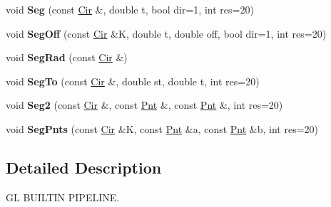 \begin{DoxyCompactItemize}
\item 
\hypertarget{namespacevsr_1_1_g_l_1_1_glyph_acb99cc6521fcb15255ce48960366b83c}{void {\bfseries Seg} (const \hyperlink{namespacevsr_a2744605aa828e495fc85463b7ae0d045}{Cir} \&, double t, bool dir=1, int res=20)}\label{namespacevsr_1_1_g_l_1_1_glyph_acb99cc6521fcb15255ce48960366b83c}

\item 
\hypertarget{namespacevsr_1_1_g_l_1_1_glyph_a65e6d07928718a67c6457af3cc1c11c5}{void {\bfseries Seg\-Off} (const \hyperlink{namespacevsr_a2744605aa828e495fc85463b7ae0d045}{Cir} \&K, double t, double off, bool dir=1, int res=20)}\label{namespacevsr_1_1_g_l_1_1_glyph_a65e6d07928718a67c6457af3cc1c11c5}

\item 
\hypertarget{namespacevsr_1_1_g_l_1_1_glyph_a78e83c5f8434a503c6eef2fd3fae5078}{void {\bfseries Seg\-Rad} (const \hyperlink{namespacevsr_a2744605aa828e495fc85463b7ae0d045}{Cir} \&)}\label{namespacevsr_1_1_g_l_1_1_glyph_a78e83c5f8434a503c6eef2fd3fae5078}

\item 
\hypertarget{namespacevsr_1_1_g_l_1_1_glyph_a0889d158ceb32861928d7a199e6713e4}{void {\bfseries Seg\-To} (const \hyperlink{namespacevsr_a2744605aa828e495fc85463b7ae0d045}{Cir} \&, double st, double t, int res=20)}\label{namespacevsr_1_1_g_l_1_1_glyph_a0889d158ceb32861928d7a199e6713e4}

\item 
\hypertarget{namespacevsr_1_1_g_l_1_1_glyph_ad6c129eb7dc399e7d3dd73c5c0fd1d83}{void {\bfseries Seg2} (const \hyperlink{namespacevsr_a2744605aa828e495fc85463b7ae0d045}{Cir} \&, const \hyperlink{namespacevsr_a2d05beb9721c5d9211b479af6d47222d}{Pnt} \&, const \hyperlink{namespacevsr_a2d05beb9721c5d9211b479af6d47222d}{Pnt} \&, int res=20)}\label{namespacevsr_1_1_g_l_1_1_glyph_ad6c129eb7dc399e7d3dd73c5c0fd1d83}

\item 
\hypertarget{namespacevsr_1_1_g_l_1_1_glyph_a6ef72395de1b945299d3b7972918b43f}{void {\bfseries Seg\-Pnts} (const \hyperlink{namespacevsr_a2744605aa828e495fc85463b7ae0d045}{Cir} \&K, const \hyperlink{namespacevsr_a2d05beb9721c5d9211b479af6d47222d}{Pnt} \&a, const \hyperlink{namespacevsr_a2d05beb9721c5d9211b479af6d47222d}{Pnt} \&b, int res=20)}\label{namespacevsr_1_1_g_l_1_1_glyph_a6ef72395de1b945299d3b7972918b43f}

\end{DoxyCompactItemize}


\subsection{Detailed Description}
G\-L B\-U\-I\-L\-T\-I\-N P\-I\-P\-E\-L\-I\-N\-E. 